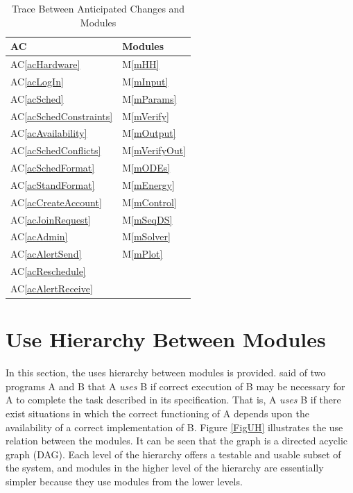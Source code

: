 \documentclass[12pt, titlepage]{article}
\newcommand{\acref}[1]{AC\ref{#1}}
\newcommand{\mref}[1]{M\ref{#1}}
\begin{document}
\begin{table}[H]
\centering
\begin{tabular}{p{} p{}}
\toprule
\textbf{AC} & \textbf{Modules}\\
\midrule
\acref{acHardware} & \mref{mHH}\\
\acref{acLogIn} & \mref{mInput}\\
\acref{acSched} & \mref{mParams}\\
\acref{acSchedConstraints} & \mref{mVerify}\\
\acref{acAvailability} & \mref{mOutput}\\
\acref{acSchedConflicts} & \mref{mVerifyOut}\\
\acref{acSchedFormat} & \mref{mODEs}\\
\acref{acStandFormat} & \mref{mEnergy}\\
\acref{acCreateAccount} & \mref{mControl}\\
\acref{acJoinRequest} & \mref{mSeqDS}\\
\acref{acAdmin} & \mref{mSolver}\\
\acref{acAlertSend} & \mref{mPlot}\\
\acref{acReschedule} & \\
\acref{acAlertReceive} & \\
\bottomrule
\end{tabular}
\caption{Trace Between Anticipated Changes and Modules}
\label{TblACT}
\end{table}

\section{Use Hierarchy Between Modules} \label{SecUse}

In this section, the uses hierarchy between modules is
provided. \citet{Parnas1978} said of two programs A and B that A {\em uses} B if
correct execution of B may be necessary for A to complete the task described in
its specification. That is, A {\em uses} B if there exist situations in which
the correct functioning of A depends upon the availability of a correct
implementation of B.  Figure \ref{FigUH} illustrates the use relation between
the modules. It can be seen that the graph is a directed acyclic graph
(DAG). Each level of the hierarchy offers a testable and usable subset of the
system, and modules in the higher level of the hierarchy are essentially simpler
because they use modules from the lower levels.

\end{document}
